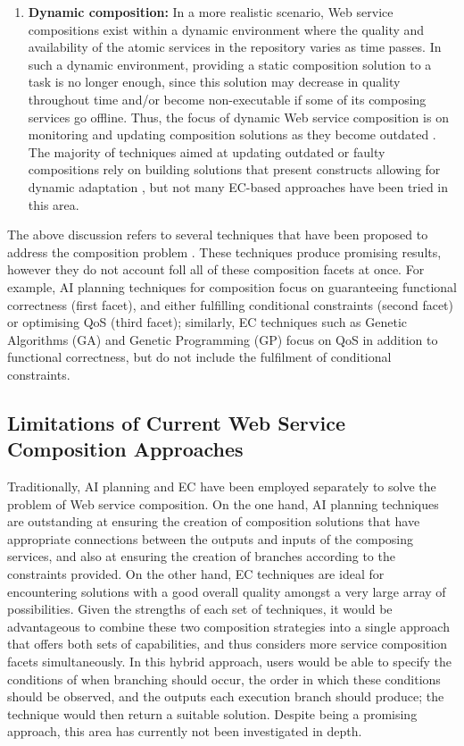 \begin{enumerate}
 
 \item \textbf{Dynamic composition:} In a more realistic scenario, Web service compositions exist within a dynamic environment where the quality and availability of the atomic services in the repository varies as time passes. In such a dynamic environment, providing a static composition solution to a task is no longer enough, since this solution may decrease in quality throughout time and/or become non-executable if some of its composing services go offline. Thus, the focus of dynamic Web service composition is on monitoring and updating composition solutions as they become outdated \cite{li2014fault}. The majority of techniques aimed at updating outdated or faulty compositions rely on building solutions that present constructs allowing for dynamic adaptation \cite{alferez2014dynamic}, but not many EC-based approaches have been tried in this area.
\end{enumerate}

The above discussion refers to several techniques that have been proposed to address the composition problem \cite{rao2005survey}. These techniques produce promising results,
however they do not account foll all of these composition facets at once. For example, AI planning techniques for composition \cite{huang2009effective,deng2013efficient} focus on guaranteeing functional correctness (first facet), and either fulfilling conditional constraints (second facet) or optimising QoS (third facet); similarly, EC techniques such as Genetic Algorithms (GA) and Genetic Programming (GP) \cite{rodriguez2010composition,wang2012survey} focus on QoS in addition to functional correctness, but do not include the fulfilment of conditional constraints.

\subsection{Limitations of Current Web Service Composition Approaches}


Traditionally, AI planning and EC have been employed separately to solve the problem of Web service composition. On the one hand, AI planning techniques are outstanding at ensuring the creation of composition solutions that have appropriate connections between the outputs and inputs of the composing services, and also at ensuring the creation of branches according to the constraints provided. On the other hand, EC techniques are ideal for encountering solutions with a good overall quality amongst a very large array of possibilities. Given the strengths of each set of techniques, it would be advantageous to combine these two composition strategies into a single approach that offers both sets of capabilities, and thus considers more service composition facets simultaneously. In this hybrid approach, users would be able to specify the conditions of when branching should occur, the order in which these conditions should be observed, and the outputs each execution branch should produce; the technique would then return a suitable solution. Despite being a promising approach, this area has currently not been investigated in depth.

